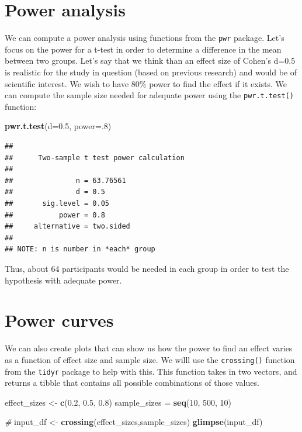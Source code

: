 \documentclass[
  12pt,
]{book}
\newenvironment{Shaded}{\begin{snugshade}}{\end{snugshade}}
\newcommand{\AttributeTok}[1]{\textcolor[rgb]{0.13,0.29,0.53}{#1}}
\newcommand{\CommentTok}[1]{\textcolor[rgb]{0.56,0.35,0.01}{\textit{#1}}}
\newcommand{\DecValTok}[1]{\textcolor[rgb]{0.00,0.00,0.81}{#1}}
\newcommand{\FloatTok}[1]{\textcolor[rgb]{0.00,0.00,0.81}{#1}}
\newcommand{\FunctionTok}[1]{\textcolor[rgb]{0.13,0.29,0.53}{\textbf{#1}}}
\newcommand{\NormalTok}[1]{#1}
\newcommand{\OtherTok}[1]{\textcolor[rgb]{0.56,0.35,0.01}{#1}}
\begin{document}
\hypertarget{power-analysis}{%
\section{Power analysis}\label{power-analysis}}

We can compute a power analysis using functions from the \texttt{pwr} package. Let's focus on the power for a t-test in order to determine a difference in the mean between two groups. Let's say that we think than an effect size of Cohen's d=0.5 is realistic for the study in question (based on previous research) and would be of scientific interest. We wish to have 80\% power to find the effect if it exists. We can compute the sample size needed for adequate power using the \texttt{pwr.t.test()} function:

\begin{Shaded}
\begin{Highlighting}[]
\FunctionTok{pwr.t.test}\NormalTok{(}\AttributeTok{d=}\FloatTok{0.5}\NormalTok{, }\AttributeTok{power=}\NormalTok{.}\DecValTok{8}\NormalTok{)}
\end{Highlighting}
\end{Shaded}

\begin{verbatim}
## 
##      Two-sample t test power calculation 
## 
##               n = 63.76561
##               d = 0.5
##       sig.level = 0.05
##           power = 0.8
##     alternative = two.sided
## 
## NOTE: n is number in *each* group
\end{verbatim}

Thus, about 64 participants would be needed in each group in order to test the hypothesis with adequate power.

\hypertarget{power-curves}{%
\section{Power curves}\label{power-curves}}

We can also create plots that can show us how the power to find an effect varies as a function of effect size and sample size. We willl use the \texttt{crossing()} function from the \texttt{tidyr} package to help with this. This function takes in two vectors, and returns a tibble that contains all possible combinations of those values.

\begin{Shaded}
\begin{Highlighting}[]
\NormalTok{effect\_sizes }\OtherTok{\textless{}{-}} \FunctionTok{c}\NormalTok{(}\FloatTok{0.2}\NormalTok{, }\FloatTok{0.5}\NormalTok{, }\FloatTok{0.8}\NormalTok{) }
\NormalTok{sample\_sizes }\OtherTok{=} \FunctionTok{seq}\NormalTok{(}\DecValTok{10}\NormalTok{, }\DecValTok{500}\NormalTok{, }\DecValTok{10}\NormalTok{)}

\CommentTok{\#}
\NormalTok{input\_df }\OtherTok{\textless{}{-}} \FunctionTok{crossing}\NormalTok{(effect\_sizes,sample\_sizes)}
\FunctionTok{glimpse}\NormalTok{(input\_df)}
\end{Highlighting}
\end{Shaded}
\end{document}
